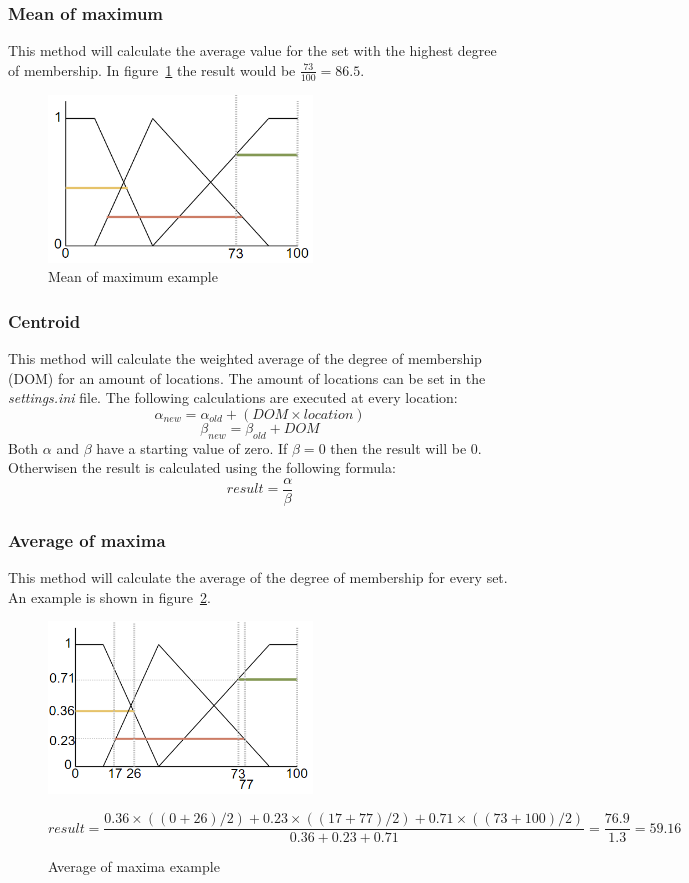 \documentclass[10pt]{extarticle} %
\begin{document}
   \subsubsection {Mean of maximum}  
   This method will calculate the average value for the set with the highest degree of membership. In figure~\ref{fig:MOM} the result would be \(\frac{73}{100}=86.5\). 
   \begin{figure}[h!]
   \begin{center}
   \includegraphics[width=7cm]{MOM.png}
   \end{center}
   \caption{Mean of maximum example}
   \label{fig:MOM}
   \end{figure}
   \subsubsection {Centroid}  
   This method will calculate the weighted average of the degree of membership (DOM) for an amount of locations. The amount of locations can be set in the \emph{settings.ini} file. The following calculations are executed at every location:
   \[ \alpha_{new} = \alpha_{old} + (DOM \times location) \]
   \[ \beta_{new} = \beta_{old} + DOM \]
   Both \(\alpha\) and \(\beta\) have a starting value of zero. If \(\beta = 0\) then the result will be \(0\). 
   Otherwisen the result is calculated using the following formula:
   \[ result = \frac{\alpha}{\beta} \]
   
   \subsubsection {Average of maxima}  
   This method will calculate the average of the degree of membership for every set. An example is shown in figure~\ref{fig:maxAv}.
   \begin{figure}[h!]
   \begin{center}
   \includegraphics[width=7cm]{maxAv.png}
   \end{center}
   \[ result = \frac{0.36 \times ((0 + 26) / 2) + 0.23 \times ((17 + 77) / 2) + 0.71 \times ((73 + 100) / 2)}{0.36 + 0.23 + 0.71} = \frac{76.9}{1.3} = {59.16}\]
   \caption{Average of maxima example}
   \label{fig:maxAv}
   \end{figure}

\newpage
 
\end{document}
